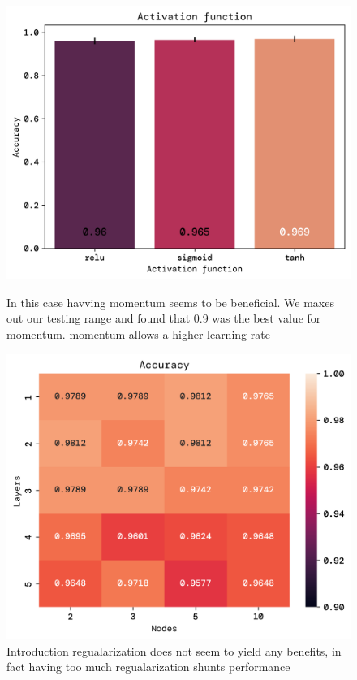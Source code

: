 \documentclass[twoside,11pt]{report}
\begin{document}
\begin{figure}[!ht]
    \begin{minipage}[t]{0.5\textwidth - 1mm}
        \begin{center}
            \includegraphics[width=\textwidth]{../runsAndFigures/accuracy_activ.png}
        \end{center}
        \caption{In this case havving momentum seems to be beneficial. We maxes out our testing range and found that 0.9 was the best value for momentum. momentum allows a higher learning rate}\label{fig:accuracy_optimizer}
    \end{minipage}
    \hspace{2mm}
    \begin{minipage}[t]{0.5\textwidth - 1mm}
        \begin{center}
            \includegraphics[width=\textwidth]{../runsAndFigures/accuracy_layers_nodes.png}
        \end{center}
        \caption{Introduction regualarization does not seem to yield any benefits, in fact
        having too much regualarization shunts performance}\label{fig:accuracy_aplha}
    \end{minipage}
\end{figure}
\end{document}

